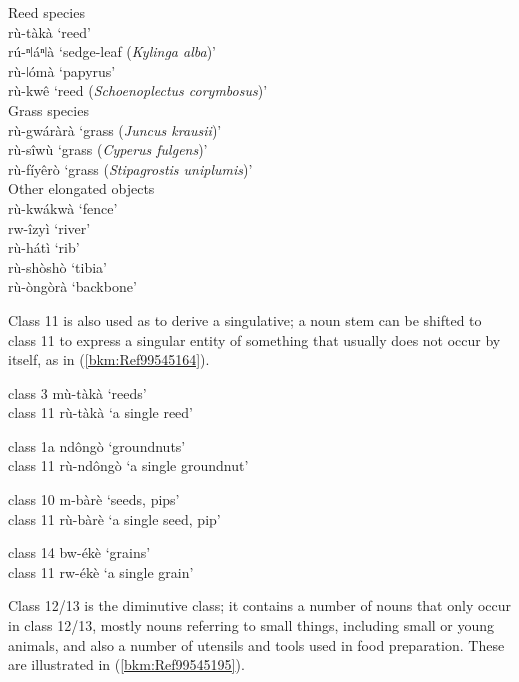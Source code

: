 \ea 
Reed species\\ 
rù-tàkà \tab ‘reed’\\
rú-ⁿǀáⁿǀà \tab ‘sedge-leaf (\textit{Kylinga alba})’\\
rù-ǀómà \tab ‘papyrus’\\
rù-kwê \tab ‘reed (\textit{Schoenoplectus corymbosus})’\\
\ex Grass species \\
rù-gwáràrà \tab ‘grass (\textit{Juncus krausii})’\\
rù-sîwù \tab ‘grass (\textit{Cyperus fulgens})’\\
rù-fíyêrò \tab ‘grass (\textit{Stipagrostis uniplumis})’\\
\ex Other elongated objects \\
rù-kwákwà \tab ‘fence’\\
rw-îzyì \tab ‘river’\\
rù-hátì \tab ‘rib’\\
rù-shòshò \tab ‘tibia’\\
rù-òngòrà \tab ‘backbone’\\
\z\z

Class 11 is also used as to derive a singulative; a noun stem can be shifted to class 11 to express a singular entity of something that usually does not occur by itself, as in (\ref{bkm:Ref99545164}).

\ea
\label{bkm:Ref99545164}

\ea
  class 3      mù-tàkà    ‘reeds’\\
class 11    rù-tàkà    ‘a single reed’

\ex
  class 1a    ndôngò    ‘groundnuts’\\
class 11    rù-ndôngò    ‘a single groundnut’

\ex
  class 10    m-bàrè    ‘seeds, pips’\\
class 11    rù-bàrè    ‘a single seed, pip’

\ex
  class 14    bw-ékè    ‘grains’\\
class 11    rw-ékè    ‘a single grain’
\z\z

Class 12/13 is the diminutive class; it contains a number of nouns that only occur in class 12/13, mostly nouns referring to small things, including small or young animals, and also a number of utensils and tools used in food preparation. These are illustrated in (\ref{bkm:Ref99545195}).

